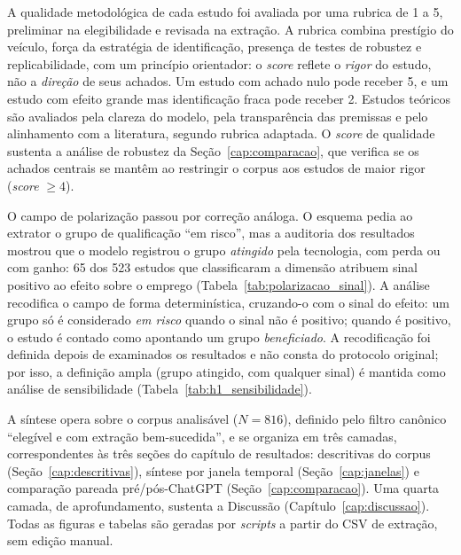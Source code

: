 
A qualidade metodológica de cada estudo foi avaliada por uma rubrica de 1 a 5, preliminar na elegibilidade e revisada na extração. A rubrica combina prestígio do veículo, força da estratégia de identificação, presença de testes de robustez e replicabilidade, com um princípio orientador: o \textit{score} reflete o \emph{rigor} do estudo, não a \emph{direção} de seus achados. Um estudo com achado nulo pode receber 5, e um estudo com efeito grande mas identificação fraca pode receber 2. Estudos teóricos são avaliados pela clareza do modelo, pela transparência das premissas e pelo alinhamento com a literatura, segundo rubrica adaptada. O \textit{score} de qualidade sustenta a análise de robustez da Seção~\ref{cap:comparacao}, que verifica se os achados centrais se mantêm ao restringir o corpus aos estudos de maior rigor (\textit{score} $\geq 4$).


O campo de polarização passou por correção análoga. O esquema pedia ao extrator o grupo de qualificação ``em risco'', mas a auditoria dos resultados mostrou que o modelo registrou o grupo \emph{atingido} pela tecnologia, com perda ou com ganho: 65 dos 523 estudos que classificaram a dimensão atribuem sinal positivo ao efeito sobre o emprego (Tabela~\ref{tab:polarizacao_sinal}). A análise recodifica o campo de forma determinística, cruzando-o com o sinal do efeito: um grupo só é considerado \emph{em risco} quando o sinal não é positivo; quando é positivo, o estudo é contado como apontando um grupo \emph{beneficiado}. A recodificação foi definida depois de examinados os resultados e não consta do protocolo original; por isso, a definição ampla (grupo atingido, com qualquer sinal) é mantida como análise de sensibilidade (Tabela~\ref{tab:h1_sensibilidade}).

A síntese opera sobre o corpus analisável ($N = 816$), definido pelo filtro canônico ``elegível e com extração bem-sucedida'', e se organiza em três camadas, correspondentes às três seções do capítulo de resultados: descritivas do corpus (Seção~\ref{cap:descritivas}), síntese por janela temporal (Seção~\ref{cap:janelas}) e comparação pareada pré/pós-ChatGPT (Seção~\ref{cap:comparacao}). Uma quarta camada, de aprofundamento, sustenta a Discussão (Capítulo~\ref{cap:discussao}). Todas as figuras e tabelas são geradas por \textit{scripts} a partir do CSV de extração, sem edição manual.

